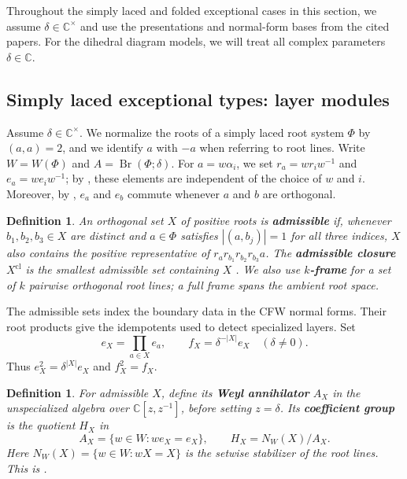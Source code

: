 \documentclass[11pt,a4paper]{amsart}
\newcommand{\Br}{\operatorname{Br}}\newcommand{\Irr}{\operatorname{Irr}}
\theoremstyle{uprightdefinition}
\newtheorem{definition}[theorem]{Definition}
\theoremstyle{remark}\newtheorem{remark}[theorem]{Remark}
\begin{document}
Throughout the simply laced and folded exceptional cases in this section, we assume
$\delta\in\mathbb C^\times$ and use the presentations and normal-form bases from the cited papers. For the dihedral diagram models, we will treat all complex parameters $\delta\in\mathbb C$.

\subsection{Simply laced exceptional types: layer modules}
Assume $\delta\in\mathbb C^\times$. We normalize the roots of a simply laced root system $\Phi$ by $(a,a)=2$, and we identify $a$ with $-a$
when referring to root lines. Write $W=W(\Phi)$ and $A=\Br(\Phi;\delta)$.
For $a=w\alpha_i$, we set
$r_a=wr_iw^{-1}$ and $e_a=we_iw^{-1}$; by \cite[equation~(4) and Lemma~4.2]{CFW2009}, these elements are independent
of the choice of $w$ and $i$.
Moreover, by \cite[Lemma~4.3(iii)]{CFW2009}, $e_a$ and $e_b$ commute whenever $a$ and $b$ are orthogonal.
\begin{definition}\label{def:admissible-root-sets}
\cite[Section~1 and Lemma~2.1]{CFW2009}
An orthogonal
set $X$ of positive roots is \textbf{admissible} if, whenever
$b_1,b_2,b_3\in X$ are distinct and $a\in\Phi$ satisfies
$|(a,b_j)|=1$ for all three indices, $X$ also contains the positive
representative of
$r_a r_{b_1}r_{b_2}r_{b_3}a$.
The \textbf{admissible closure} $X^{\mathrm{cl}}$ is the smallest
admissible set containing $X$ \cite[Definition~2.2]{CFW2009}.
We also use \textbf{$k$-frame} for a set of $k$ pairwise orthogonal
root lines; a full frame spans the ambient root space.
\end{definition}

The admissible sets index the boundary data in the CFW normal forms.
Their root products give the idempotents used to detect specialized layers.
Set
\[
 e_X=\prod_{a\in X}e_a,\qquad
 f_X=\delta^{-|X|}e_X\quad(\delta\ne0).
\]
Thus $e_X^2=\delta^{|X|}e_X$ and $f_X^2=f_X$.
\begin{definition}\label{def:coefficient-group}
For admissible $X$, define its \textbf{Weyl annihilator}
$A_X$ in the unspecialized algebra over $\mathbb C[z,z^{-1}]$,
before setting $z=\delta$. Its \textbf{coefficient group} is the quotient
$H_X$ in
\[
 A_X=\{w\in W:we_X=e_X\},\qquad
 H_X=N_W(X)/A_X.
\]
Here $N_W(X)=\{w\in W:wX=X\}$ is the setwise stabilizer of the
root lines. This is \cite[equation~(7) and Proposition~4.7]{CFW2009}.
\end{definition}
\end{document}
